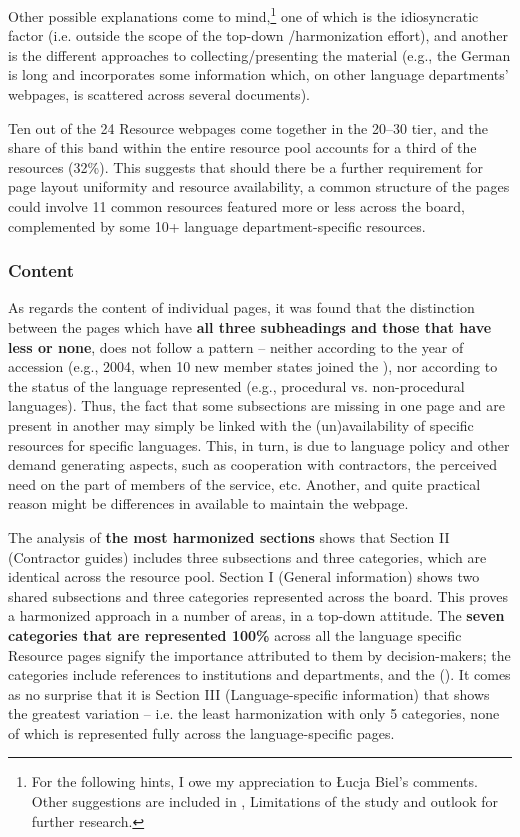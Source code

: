\documentclass[output=paper]{langsci/langscibook}
\begin{document}
Other possible explanations come to mind,\footnote{For the following hints, I owe my appreciation to Łucja Biel’s comments. Other suggestions are included in , Limitations of the study and outlook for further research.} one of which is the idiosyncratic factor (i.e. outside the scope of the top-down /harmonization effort), and another is the different approaches to collecting/presenting the material (e.g., the German  is long and incorporates some information which, on other language departments’ webpages, is scattered across several documents). 

Ten out of the 24 Resource webpages come together in the 20–30 tier, and the share of this band within the entire resource pool accounts for a third of the resources (32\%). This suggests that should there be a further requirement for page layout uniformity and resource availability, a common structure of the pages could involve 11 common resources featured more or less across the board, complemented by some 10+ language department-specific resources. 

\subsubsection{Content}

As regards the content of individual pages, it was found that the distinction between the pages which have \textbf{all three subheadings and those that have less or none}, does not follow a pattern – neither according to the year of accession (e.g., 2004, when 10 new member states joined the ), nor according to the status of the language represented (e.g., procedural vs. non-procedural languages). Thus, the fact that some subsections are missing in one page and are present in another may simply be linked with the (un)availability of specific resources for specific languages. This, in turn, is due to language policy and other demand generating aspects, such as cooperation with contractors, the perceived need on the part of members of the service, etc. Another, and quite practical reason might be differences in  available to maintain the webpage.

The analysis of \textbf{the most harmonized sections} shows that Section II (Contractor guides) includes three subsections and three categories, which are identical across the resource pool. Section I (General  information) shows two shared subsections and three categories represented across the board. This proves a harmonized approach in a number of areas, in a top-down attitude. The \textbf{seven categories that are represented 100\%} across all the language specific Resource pages signify the importance attributed to them by decision-makers; the categories include references to  institutions and  departments,  and the  (). It comes as no surprise that it is Section III (Language-specific information) that shows the greatest variation – i.e. the least harmonization with only 5 categories, none of which is represented fully across the language-specific pages.
\end{document}
